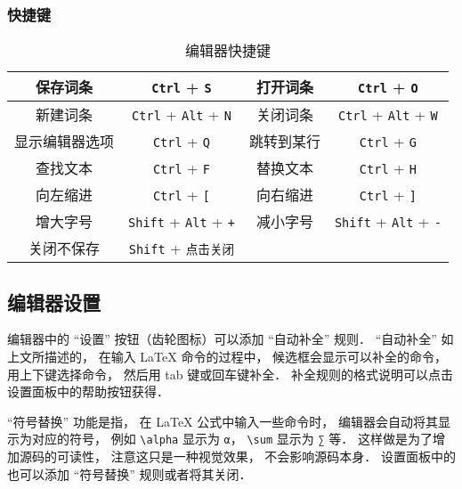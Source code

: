 \subsubsection{快捷键}

\begin{table}[ht]
\centering
\caption{编辑器快捷键}\label{editor_tab1}
\begin{tabular}{|c|c|c|c|}
\hline
保存词条 & \verb|Ctrl| + \verb|S| & 打开词条 & \verb|Ctrl| + \verb|O| \\
\hline
新建词条 & \verb|Ctrl| + \verb|Alt| + \verb|N| & 关闭词条 & \verb|Ctrl| + \verb|Alt| + \verb|W| \\
\hline
显示编辑器选项 & \verb|Ctrl| + \verb|Q| & 跳转到某行 & \verb|Ctrl| + \verb|G| \\
\hline
查找文本 & \verb|Ctrl| + \verb|F| & 替换文本 & \verb|Ctrl| + \verb|H| \\
\hline
向左缩进 & \verb|Ctrl| + \verb|[| & 向右缩进 & \verb|Ctrl| + \verb|]| \\
\hline
增大字号 & \verb|Shift| + \verb|Alt| + \verb|+| & 减小字号 & \verb|Shift| + \verb|Alt| + \verb|-| \\
\hline
关闭不保存 & \verb|Shift| + \verb|点击关闭| &  &  \\
\hline
\end{tabular}
\end{table}

\subsection{编辑器设置}
编辑器中的 “设置” 按钮（齿轮图标）可以添加 “自动补全” 规则． “自动补全” 如上文所描述的， 在输入 LaTeX 命令的过程中， 候选框会显示可以补全的命令， 用上下键选择命令， 然后用 tab 键或回车键补全． 补全规则的格式说明可以点击设置面板中的帮助按钮获得．

“符号替换” 功能是指， 在 LaTeX 公式中输入一些命令时， 编辑器会自动将其显示为对应的符号， 例如 \verb|\alpha| 显示为 \lstinline|α|， \verb|\sum| 显示为 \lstinline|∑| 等． 这样做是为了增加源码的可读性， 注意这只是一种视觉效果， 不会影响源码本身． 设置面板中的也可以添加 “符号替换” 规则或者将其关闭．

